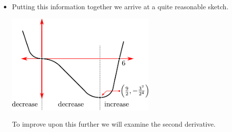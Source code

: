 \begin{eg}
\begin{itemize}
\item Putting this information together we arrive at a quite reasonable sketch.
\begin{efig}
 \begin{center}
  \includegraphics[height=5cm]{extra/sketch2}
 \end{center}
\end{efig}
To improve upon this further we will examine the second derivative.
\end{itemize}
\end{eg}



